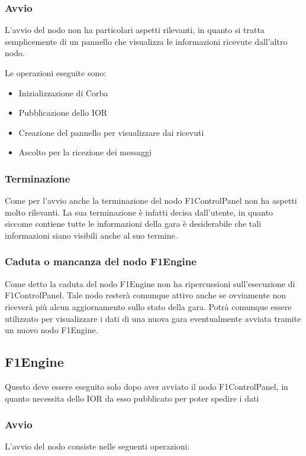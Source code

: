 \documentclass[a4paper,11pt, twoside]{book}
\begin{document}
	\subsubsection{Avvio}
	  L'avvio del nodo non ha particolari aspetti rilevanti, in quanto si tratta semplicemente di un
	  pannello che visualizza le informazioni ricevute dall'altro nodo.
	  
	  Le operazioni eseguite sono:
	  
	  \begin{itemize}
	    \item Inizializzazione di Corba
	    \item Pubblicazione dello IOR
	    \item Creazione del pannello per visualizzare  dai ricevuti
	    \item Ascolto per la ricezione dei messaggi
	  \end{itemize}
	  
	\subsubsection{Terminazione}
	  Come per l'avvio anche la terminazione del nodo F1ControlPanel non ha aspetti molto rilevanti. 
	  La sua terminazione è infatti decisa dall'utente, in quanto siccome contiene tutte le informazioni
	  della gara è desiderabile che tali informazioni siano visibili anche al suo termine.
	  
	\subsubsection{Caduta o mancanza del nodo F1Engine}
	  Come detto la caduta del nodo F1Engine non ha ripercussioni sull'esecuzione di F1ControlPanel. Tale nodo
	  resterà comunque attivo anche se ovviamente non riceverà più alcun aggiornamento sullo stato della gara.
	  Potrà comunque essere utilizzato per visualizzare i dati di una nuova gara eventualmente avviata tramite un nuovo nodo
	  F1Engine.

      \subsection{F1Engine}
        Questo deve essere eseguito solo dopo aver avviato il nodo F1ControlPanel, in quanto necessita
	dello IOR da esso pubblicato per poter spedire i dati
	
	\subsubsection{Avvio}
	  L'avvio del nodo consiste nelle seguenti operazioni:
	  
\end{document}
